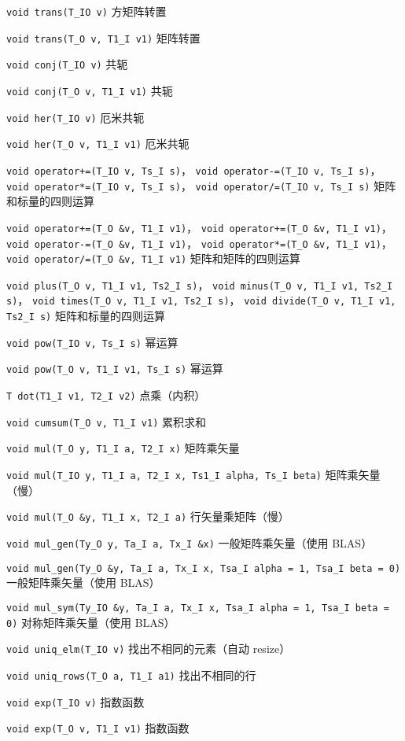 \verb|void trans(T_IO v)| 方矩阵转置

\verb|void trans(T_O v, T1_I v1)| 矩阵转置

\verb|void conj(T_IO v)| 共轭

\verb|void conj(T_O v, T1_I v1)| 共轭

\verb|void her(T_IO v)| 厄米共轭

\verb|void her(T_O v, T1_I v1)| 厄米共轭

\verb|void operator+=(T_IO v, Ts_I s)|， \verb|void operator-=(T_IO v, Ts_I s)|， \verb|void operator*=(T_IO v, Ts_I s)|， \verb|void operator/=(T_IO v, Ts_I s)| 矩阵和标量的四则运算

\verb|void operator+=(T_O &v, T1_I v1)|， \verb|void operator+=(T_O &v, T1_I v1)|， \verb|void operator-=(T_O &v, T1_I v1)|， \verb|void operator*=(T_O &v, T1_I v1)|， \verb|void operator/=(T_O &v, T1_I v1)| 矩阵和矩阵的四则运算

\verb|void plus(T_O v, T1_I v1, Ts2_I s)|， \verb|void minus(T_O v, T1_I v1, Ts2_I s)|， \verb|void times(T_O v, T1_I v1, Ts2_I s)|， \verb|void divide(T_O v, T1_I v1, Ts2_I s)| 矩阵和标量的四则运算

\verb|void pow(T_IO v, Ts_I s)| 幂运算

\verb|void pow(T_O v, T1_I v1, Ts_I s)| 幂运算

\verb|T dot(T1_I v1, T2_I v2)| 点乘（内积）

\verb|void cumsum(T_O v, T1_I v1)| 累积求和

\verb|void mul(T_O y, T1_I a, T2_I x)| 矩阵乘矢量

\verb|void mul(T_IO y, T1_I a, T2_I x, Ts1_I alpha, Ts_I beta)| 矩阵乘矢量（慢）

\verb|void mul(T_O &y, T1_I x, T2_I a)| 行矢量乘矩阵（慢）

\verb|void mul_gen(Ty_O y, Ta_I a, Tx_I &x)| 一般矩阵乘矢量（使用 BLAS）

\verb|void mul_gen(Ty_O &y, Ta_I a, Tx_I x, Tsa_I alpha = 1, Tsa_I beta = 0)| 一般矩阵乘矢量（使用 BLAS）

\verb|void mul_sym(Ty_IO &y, Ta_I a, Tx_I x, Tsa_I alpha = 1, Tsa_I beta = 0)| 对称矩阵乘矢量（使用 BLAS）

\verb|void uniq_elm(T_IO v)| 找出不相同的元素（自动 resize）

\verb|void uniq_rows(T_O a, T1_I a1)| 找出不相同的行

\verb|void exp(T_IO v)| 指数函数

\verb|void exp(T_O v, T1_I v1)| 指数函数
